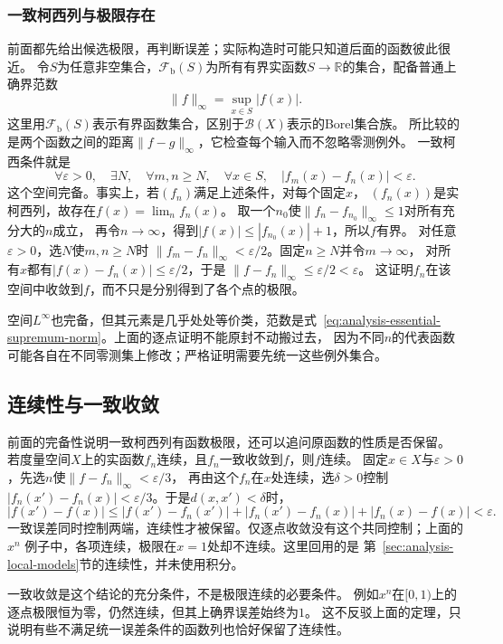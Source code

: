 \subsubsection{一致柯西列与极限存在}
前面都先给出候选极限，再判断误差；实际构造时可能只知道后面的函数彼此很近。
令$S$为任意非空集合，$\mathcal F_{\mathrm b}(S)$为所有有界实函数$S\to\mathbb{R}$的集合，配备普通上确界范数
\[   \lVert f\rVert_{\infty}   =   \sup_{x\in S}|f(x)|. \]
这里用$\mathcal F_{\mathrm b}(S)$表示有界函数集合，区别于$\mathcal B(X)$表示的Borel集合族。
所比较的是两个函数之间的距离$\lVert f-g\rVert_\infty$，它检查每个输入而不忽略零测例外。
一致柯西条件就是
\[
 \forall\varepsilon>0,\quad\exists N,\quad
 \forall m,n\geq N,\quad\forall x\in S,\quad
 |f_m(x)-f_n(x)|<\varepsilon.
\]
这个空间完备。事实上，若$(f_n)$满足上述条件，对每个固定$x$，
$(f_n(x))$是实柯西列，故存在$f(x)=\lim_n f_n(x)$。
取一个$n_0$使$\lVert f_n-f_{n_0}\rVert_\infty\leq1$对所有充分大的$n$成立，
再令$n\to\infty$，得到$|f(x)|\leq|f_{n_0}(x)|+1$，所以$f$有界。
对任意$\varepsilon>0$，选$N$使$m,n\geq N$时
$\lVert f_m-f_n\rVert_\infty<\varepsilon/2$。固定$n\geq N$并令$m\to\infty$，
对所有$x$都有$|f(x)-f_n(x)|\leq\varepsilon/2$，于是
$\lVert f-f_n\rVert_\infty\leq\varepsilon/2<\varepsilon$。
这证明$f_n$在该空间中收敛到$f$，而不只是分别得到了各个点的极限。

空间$L^\infty$也完备，但其元素是几乎处处等价类，范数是式~\eqref{eq:analysis-essential-supremum-norm}。上面的逐点证明不能原封不动搬过去， 因为不同$n$的代表函数可能各自在不同零测集上修改；严格证明需要先统一这些例外集合。


\subsection{连续性与一致收敛}
前面的完备性说明一致柯西列有函数极限，还可以追问原函数的性质是否保留。
若度量空间$X$上的实函数$f_n$连续，且$f_n$一致收敛到$f$，则$f$连续。
固定$x\in X$与$\varepsilon>0$，先选$n$使$\lVert f-f_n\rVert_\infty<\varepsilon/3$，
再由这个$f_n$在$x$处连续，选$\delta>0$控制
$|f_n(x')-f_n(x)|<\varepsilon/3$。于是$d(x,x')<\delta$时，
\[
 |f(x')-f(x)|
 \leq |f(x')-f_n(x')|+|f_n(x')-f_n(x)|+|f_n(x)-f(x)|
 <\varepsilon.
\]
一致误差同时控制两端，连续性才被保留。仅逐点收敛没有这个共同控制；上面的$x^n$
例子中，各项连续，极限在$x=1$处却不连续。这里回用的是
第~\ref{sec:analysis-local-models}节的连续性，并未使用积分。

一致收敛是这个结论的充分条件，不是极限连续的必要条件。
例如$x^n$在$[0,1)$上的逐点极限恒为零，仍然连续，但其上确界误差始终为$1$。
这不反驳上面的定理，只说明有些不满足统一误差条件的函数列也恰好保留了连续性。

